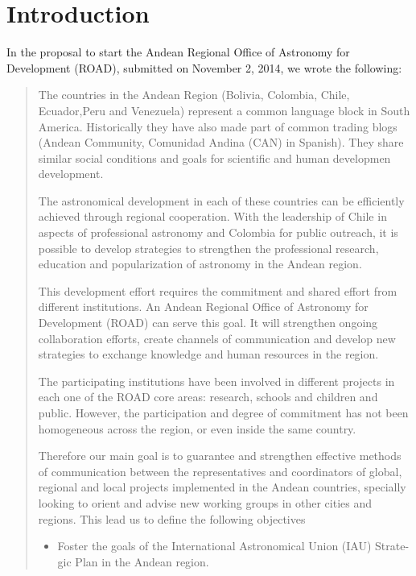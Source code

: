\newpage
\section{Introduction}

In the proposal to start the Andean Regional Office of Astronomy for
Development (ROAD), submitted on November 2, 2014, we wrote the following:

\begin{quote}
The countries in the Andean Region (Bolivia, Colombia, Chile,
 Ecuador,Peru and Venezuela) represent a common language block in
 South America. 
 Historically they have also made part of common trading blogs (Andean
 Community, Comunidad Andina (CAN) in Spanish). 
They share similar social conditions and goals for scientific and
 human developmen development. 


The astronomical development in each of these countries can be
efficiently achieved through regional cooperation. 
With the leadership of Chile in aspects of professional astronomy and
Colombia for public outreach, it is possible to develop strategies to
strengthen the professional research, education and popularization of
astronomy in the Andean region. 

This development effort requires the commitment and shared effort from
different institutions. 
An Andean Regional Office of Astronomy for Development (ROAD) can
serve this goal. It will strengthen ongoing collaboration efforts,
create channels of communication and develop new strategies to
exchange knowledge and human resources in the region.  


The participating institutions have been involved in different
projects in each one of the ROAD core areas: research, schools and
children and public. However, the participation and degree of
commitment has not been homogeneous across the region, or even inside
the same country. 


Therefore our main goal is to guarantee and strengthen effective
methods of communication between the representatives and coordinators
of global, regional and local projects implemented in the Andean
countries, specially looking to orient and advise new working groups 
in other cities and regions. This lead us to define the following
objectives

\begin{itemize}
\item Foster the goals of the International Astronomical Union (IAU)
Strate- gic Plan in the Andean region. 


\end{itemize}
\end{quote}
